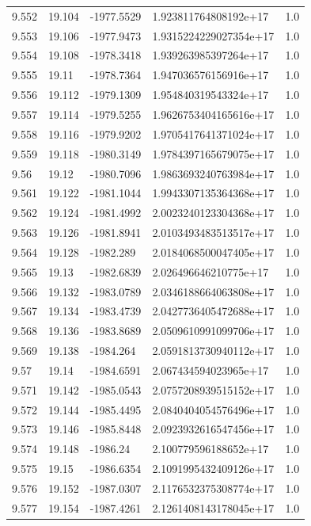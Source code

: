 \begin{tabular}{lllll}
9.552 & 19.104 & -1977.5529 & 1.923811764808192e+17 & 1.0 \\
9.553 & 19.106 & -1977.9473 & 1.9315224229027354e+17 & 1.0 \\
9.554 & 19.108 & -1978.3418 & 1.939263985397264e+17 & 1.0 \\
9.555 & 19.11 & -1978.7364 & 1.947036576156916e+17 & 1.0 \\
9.556 & 19.112 & -1979.1309 & 1.954840319543324e+17 & 1.0 \\
9.557 & 19.114 & -1979.5255 & 1.9626753404165616e+17 & 1.0 \\
9.558 & 19.116 & -1979.9202 & 1.9705417641371024e+17 & 1.0 \\
9.559 & 19.118 & -1980.3149 & 1.9784397165679075e+17 & 1.0 \\
9.56 & 19.12 & -1980.7096 & 1.9863693240763984e+17 & 1.0 \\
9.561 & 19.122 & -1981.1044 & 1.9943307135364368e+17 & 1.0 \\
9.562 & 19.124 & -1981.4992 & 2.0023240123304368e+17 & 1.0 \\
9.563 & 19.126 & -1981.8941 & 2.0103493483513517e+17 & 1.0 \\
9.564 & 19.128 & -1982.289 & 2.0184068500047405e+17 & 1.0 \\
9.565 & 19.13 & -1982.6839 & 2.026496646210775e+17 & 1.0 \\
9.566 & 19.132 & -1983.0789 & 2.0346188664063808e+17 & 1.0 \\
9.567 & 19.134 & -1983.4739 & 2.0427736405472688e+17 & 1.0 \\
9.568 & 19.136 & -1983.8689 & 2.0509610991099706e+17 & 1.0 \\
9.569 & 19.138 & -1984.264 & 2.0591813730940112e+17 & 1.0 \\
9.57 & 19.14 & -1984.6591 & 2.067434594023965e+17 & 1.0 \\
9.571 & 19.142 & -1985.0543 & 2.0757208939515152e+17 & 1.0 \\
9.572 & 19.144 & -1985.4495 & 2.0840404054576496e+17 & 1.0 \\
9.573 & 19.146 & -1985.8448 & 2.0923932616547456e+17 & 1.0 \\
9.574 & 19.148 & -1986.24 & 2.100779596188652e+17 & 1.0 \\
9.575 & 19.15 & -1986.6354 & 2.1091995432409126e+17 & 1.0 \\
9.576 & 19.152 & -1987.0307 & 2.1176532375308774e+17 & 1.0 \\
9.577 & 19.154 & -1987.4261 & 2.1261408143178045e+17 & 1.0 \\

\end{tabular}

